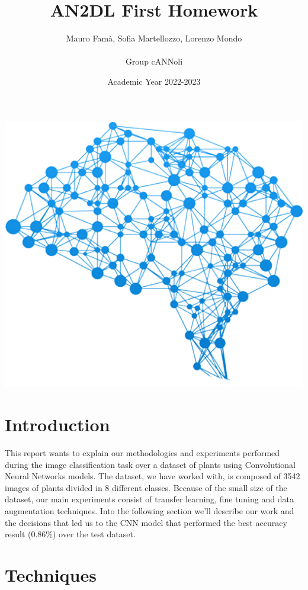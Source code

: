 \documentclass[11pt, oneside]{article}
\title{{\arial AN2DL First Homework}}
\author{{\calibri Mauro Famà,   Sofia Martellozzo,   Lorenzo Mondo\\ \\
        Group cANNoli}}
\date{Academic Year 2022-2023}
\begin{document}
\maketitle
\begin{center}
    \includegraphics[scale=0.43]{images/title.png}
\end{center}
\newpage
\vspace{.25in}


\section{Introduction}
This report wants to explain our methodologies and experiments performed during the image classification task over a dataset of plants using Convolutional Neural Networks models.
The dataset, we have worked with, is composed of 3542 images of plants divided in 8 different classes.
Because of the small size of the dataset, our main experiments consist of transfer learning, fine tuning and data augmentation techniques. Into the following section we'll describe our work and the decisions that led us to the CNN model that performed the best accuracy result (0.86\%) over the test dataset.
\section{Techniques}
\end{document}
